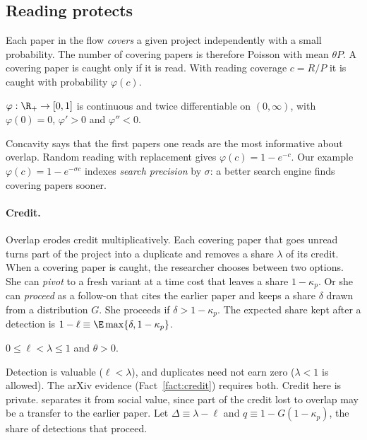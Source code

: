 \subsection{Reading protects}

Each paper in the flow \emph{covers} a given project independently with a small
probability. The number of covering papers is therefore
Poisson with mean $\theta P$. A covering paper is caught only if it is read. With reading
coverage $c=R/P$ it is caught with probability $\varphi(c)$.

\begin{assumption}[Detection]\label{ass:phi}
$\varphi:\R_+\to[0,1]$ is continuous and twice differentiable on $(0,\infty)$,
with $\varphi(0)=0$, $\varphi'>0$ and $\varphi''<0$.
\end{assumption}

Concavity says that the first papers one reads are the most informative about
overlap. Random reading with replacement gives $\varphi(c)=1-e^{-c}$. Our
example $\varphi(c)=1-e^{-\sigma c}$ indexes \emph{search precision} by
$\sigma$: a better search engine finds covering papers sooner.

\paragraph{Credit.} Overlap erodes credit multiplicatively. Each covering paper
that goes unread turns part of the project into a duplicate and removes a
share $\lambda$ of its credit. When a covering paper is caught, the
researcher chooses between two options. She can \emph{pivot} to a fresh variant at a time cost
that leaves a share $1-\kappa_p$. Or she can \emph{proceed} as a follow-on
that cites the earlier paper and keeps a share $\delta$ drawn from a
distribution $G$. She proceeds if $\delta>1-\kappa_p$. The expected share kept
after a detection is $1-\ell\equiv\E\max\{\delta,1-\kappa_p\}$.

\begin{assumption}[Credit]\label{ass:credit}
$0\le \ell<\lambda\le 1$ and $\theta>0$.
\end{assumption}

Detection is valuable ($\ell<\lambda$), and duplicates need not earn zero
($\lambda<1$ is allowed). The arXiv evidence (Fact~\ref{fact:credit}) requires
both. Credit here is private.  separates it from social
value, since part of the credit lost to overlap may be a transfer to the
earlier paper. Let $\Delta\equiv\lambda-\ell$ and $q\equiv 1-G(1-\kappa_p)$, the share
of detections that proceed.

